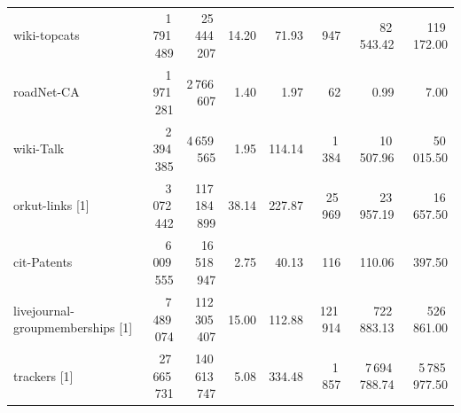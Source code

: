 \begin{tabular}{lrrrrrrr}
wiki-topcats & 1\,791\,489 & 25\,444\,207 & 14.20 & 71.93 & 947 & 82\,543.42 & 119\,172.00 \\
roadNet-CA & 1\,971\,281 & 2\,766\,607 & 1.40 & 1.97 & 62 & 0.99 & 7.00 \\
wiki-Talk & 2\,394\,385 & 4\,659\,565 & 1.95 & 114.14 & 1\,384 & 10\,507.96 & 50\,015.50 \\
orkut-links [1] & 3\,072\,442 & 117\,184\,899 & 38.14 & 227.87 & 25\,969 & 23\,957.19 & 16\,657.50 \\
cit-Patents & 6\,009\,555 & 16\,518\,947 & 2.75 & 40.13 & 116 & 110.06 & 397.50 \\
livejournal-groupmemberships [1] & 7\,489\,074 & 112\,305\,407 & 15.00 & 112.88 & 121\,914 & 722\,883.13 & 526\,861.00 \\
trackers [1] & 27\,665\,731 & 140\,613\,747 & 5.08 & 334.48 & 1\,857 & 7\,694\,788.74 & 5\,785\,977.50 \\
\bottomrule
\end{tabular}
